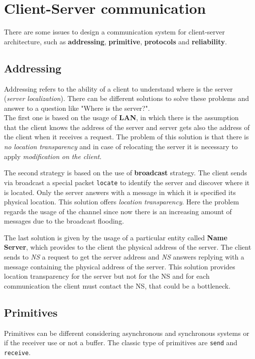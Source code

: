 \section{Client-Server communication}
There are some issues to design a communication system for client-server architecture, such as \textbf{addressing}, \textbf{primitive}, \textbf{protocols} and \textbf{reliability}.
\subsection{Addressing}
Addressing refers to the ability of a client to understand where is the server (\textit{server localization}). There can be different solutions to solve these problems and answer to a question like "Where is the server?". \\
The first one is based on the usage of \textbf{LAN}, in which there is the assumption that the client knows the address of the server and server gets also the address of the client when it receives a request.
The problem of this solution is that there is \textit{no location transparency} and in case of relocating the server it is necessary to apply \textit{modification on the client}.
\par \medskip \noindent
The second strategy is based on the use of \textbf{broadcast} strategy. The client sends via broadcast a special packet \verb!locate! to identify the server and discover where it is located. Only the server answers with a message in which it is specified its physical location. This solution offers \textit{location transparency}.
Here the problem regards the usage of the channel since now there is an increasing amount of messages due to the broadcast flooding.
\par \medskip \noindent
The last solution is given by the usage of a particular entity called \textbf{Name Server}, which provides to the client the physical address of the server. The client sends to \textit{NS} a request to get the server address and \textit{NS} answers replying with a message containing the physical address of the server.
This solution provides location transparency for the server but not for the NS and for each communication the client must contact the NS, that could be a bottleneck.

\subsection{Primitives}
Primitives can be different considering asynchronous and synchronous systems or if the receiver use or not a buffer. The classic type of primitives are \verb!send! and \verb!receive!.
